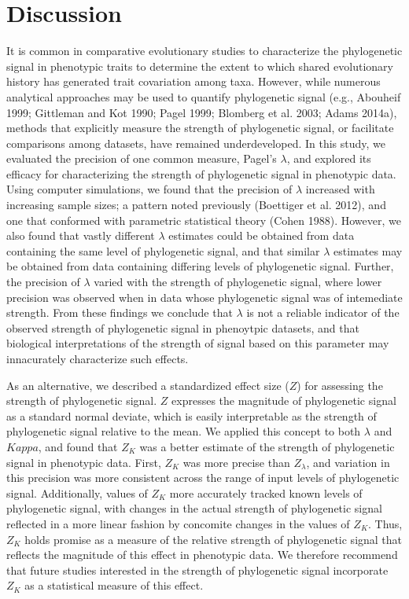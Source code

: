 \documentclass[
]{article}
\begin{document}
\hypertarget{discussion}{%
\section{Discussion}\label{discussion}}

It is common in comparative evolutionary studies to characterize the
phylogenetic signal in phenotypic traits to determine the extent to
which shared evolutionary history has generated trait covariation among
taxa. However, while numerous analytical approaches may be used to
quantify phylogenetic signal (e.g., Abouheif 1999; Gittleman and Kot
1990; Pagel 1999; Blomberg et al. 2003; Adams 2014a), methods that
explicitly measure the strength of phylogenetic signal, or facilitate
comparisons among datasets, have remained underdeveloped. In this study,
we evaluated the precision of one common measure, Pagel's \(\lambda\),
and explored its efficacy for characterizing the strength of
phylogenetic signal in phenotypic data. Using computer simulations, we
found that the precision of \(\lambda\) increased with increasing sample
sizes; a pattern noted previously (Boettiger et al. 2012), and one that
conformed with parametric statistical theory (Cohen 1988). However, we
also found that vastly different \(\lambda\) estimates could be obtained
from data containing the same level of phylogenetic signal, and that
similar \(\lambda\) estimates may be obtained from data containing
differing levels of phylogenetic signal. Further, the precision of
\(\lambda\) varied with the strength of phylogenetic signal, where lower
precision was observed when in data whose phylogenetic signal was of
intemediate strength. From these findings we conclude that \(\lambda\)
is not a reliable indicator of the observed strength of phylogenetic
signal in phenoytpic datasets, and that biological interpretations of
the strength of signal based on this parameter may innacurately
characterize such effects. \hfill\break

As an alternative, we described a standardized effect size (\(Z\)) for
assessing the strength of phylogenetic signal. \(Z\) expresses the
magnitude of phylogenetic signal as a standard normal deviate, which is
easily interpretable as the strength of phylogenetic signal relative to
the mean. We applied this concept to both \(\lambda\) and \(Kappa\), and
found that \(Z_K\) was a better estimate of the strength of phylogenetic
signal in phenotypic data. First, \(Z_K\) was more precise than
\(Z_{\lambda}\), and variation in this precision was more consistent
across the range of input levels of phylogenetic signal. Additionally,
values of \(Z_K\) more accurately tracked known levels of phylogenetic
signal, with changes in the actual strength of phylogenetic signal
reflected in a more linear fashion by concomite changes in the values of
\(Z_K\). Thus, \(Z_K\) holds promise as a measure of the relative
strength of phylogenetic signal that reflects the magnitude of this
effect in phenotypic data. We therefore recommend that future studies
interested in the strength of phylogenetic signal incorporate \(Z_K\) as
a statistical measure of this effect. \hfill\break
\end{document}
